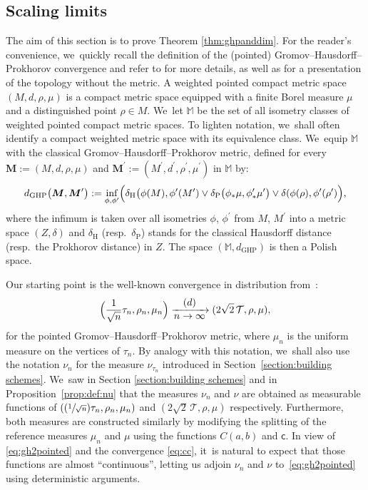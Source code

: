 \documentclass[11pt]{article}
\newcommand{\Psfrac}[2]{(\sfrac{#1}{#2})}
\newcommand{\T}{\mathcal{T}}\let\CRT\T\let\tbr\T
\theoremstyle{definition}
\begin{document}
\subsection{Scaling limits}\label{sec:scalinglimitproof}
The aim of this section is to prove Theorem \ref{thm:ghpanddim}. For the reader's convenience, we~quickly recall the definition of the (pointed) Gromov--Hausdorff--Prokhorov convergence and refer to \cite{MR3035742,khezeli2020metrization} for more details, as well as \cite{AthreayLorWinter} for a presentation of the topology without the metric. A weighted pointed compact metric space $(M,d,\rho,\mu)$ is a compact metric space equipped with a finite Borel measure $\mu$ and a distinguished point $\rho\in M$. We~let $\mathbb{M}$ be the set of all isometry classes of weighted pointed compact metric spaces. To lighten notation, we~shall often identify a compact weighted metric space with its equivalence class. We~equip $\mathbb{M}$ with the classical Gromov--Hausdorff--Prokhorov metric, defined for every $\boldsymbol{M}:=(M,d, \rho,\mu)$ and $\boldsymbol{M}^{\prime}:=(M^{\prime},d^{{\prime}},\rho^\prime,\mu^{\prime})$ in $\mathbb{M}$ by:
\[
d_{\mathrm{GHP}}\big(\boldsymbol{M},\boldsymbol{M}^{\prime}\big):=\inf\limits_{\phi,\phi^{\prime}}\Bigl(\delta_{\text{H}}\big(\phi(M),\phi^{\prime}(M^{\prime})\vee \delta_{\text{P}}\big(\phi_* \mu,\phi^{\prime}_* \mu^{\prime}\big)\vee \delta(\phi(\rho),\phi^\prime(\rho^\prime)\Bigr),
\]
where the infimum is taken over all isometries $\phi$, $\phi^{\prime}$ from $M$, $M^{\prime}$ into a metric space $(Z, \delta)$ and $\delta_{\text{H}}$ (resp.~$\delta_{\text{P}}$) stands for the classical Hausdorff distance (resp.~the Prokhorov distance) in $Z$. The space $(\mathbb{M},d_{\mathrm{GHP}})$ is then a Polish space.

Our starting point is the well-known convergence in distribution from~\cite{Ald93}:
\begin{equation}\label{eq:gh2pointed} \Bigl(\frac{1}{\sqrt{n}}\tau_n,\rho_n,\mu_n \Bigr) \xrightarrow[\textstyle n\to\infty]{\textstyle(d)} (2\sqrt{2}\,\T,\rho,\mu),
\end{equation}
for the pointed Gromov--Hausdorff--Prokhorov metric, where $\mu_n$ is the uniform measure on the vertices of $\tau_n$. By analogy with this notation, we~shall also use the notation $\nu_n$ for the measure $\nu_{\tau_n}$ introduced in Section~\ref{section:building schemes}. We~saw in Section \ref{section:building schemes} and in Proposition~\ref{prop:def:nu} that the measures $\nu_n$ and $\nu$ are obtained as measurable functions of $(\Psfrac{1}{\sqrt{n}}\tau_n,\rho_n,\mu_n)$ and $(2\sqrt{2}\,\T,\rho,\mu)$ respectively. Furthermore, both measures are constructed similarly by modifying the splitting of the reference measures $\mu_n$ and $\mu$ using the functions $C(a,b)$ and $ \mathsf{c}$. In view of \eqref{eq:gh2pointed} and the convergence \eqref{eq:cc}, it~is natural to expect that those functions are almost ``continuous'', letting us adjoin $\nu_n$ and $\nu$ to~\eqref{eq:gh2pointed} using deterministic arguments.
\end{document}
